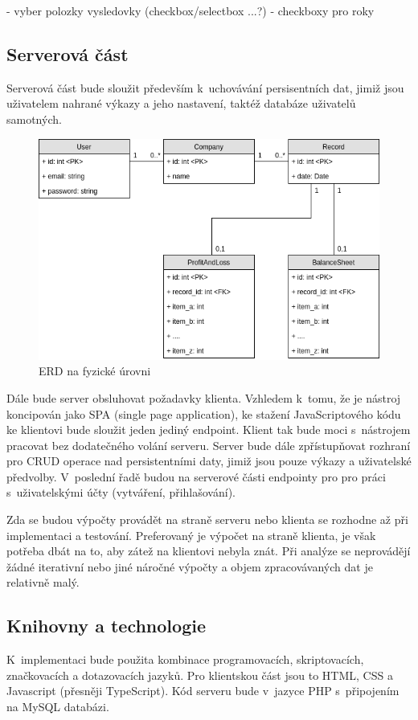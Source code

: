 - vyber polozky vysledovky (checkbox/selectbox ...?)
- checkboxy pro roky


\subsection{Serverová část}
Serverová část bude sloužit především k~uchovávání persisentních dat, jimiž jsou uživatelem nahrané výkazy a jeho nastavení, taktéž databáze uživatelů samotných.


\begin{figure}
  \centering
  \includegraphics[width=15cm]{img/erd.png}
  \caption{ERD na fyzické úrovni}
\end{figure}

Dále bude server obsluhovat požadavky klienta. Vzhledem k~tomu, že je nástroj koncipován jako SPA (single page application), ke stažení JavaScriptového kódu ke klientovi bude sloužit jeden jediný endpoint. Klient tak bude moci s~nástrojem pracovat bez dodatečného volání serveru. Server bude dále zpřístupňovat rozhraní pro CRUD operace nad persistentními daty, jimiž jsou pouze výkazy a uživatelské předvolby. V~poslední řadě budou na serverové části endpointy pro pro práci s~uživatelskými účty (vytváření, přihlašování).

Zda se budou výpočty provádět na straně serveru nebo klienta se rozhodne až při implementaci a testování. Preferovaný je výpočet na straně klienta, je však potřeba dbát na to, aby zátež na klientovi nebyla znát. Při analýze se neprovádějí žádné iterativní nebo jiné náročné výpočty a objem zpracovávaných dat je relativně malý.

\subsection{Knihovny a technologie}
K~implementaci bude použita kombinace programovacích, skriptovacích, značkovacích a dotazovacích jazyků. Pro klientskou část jsou to HTML, CSS a Javascript (přesněji TypeScript). Kód serveru bude v~jazyce PHP s~připojením na MySQL databázi.


